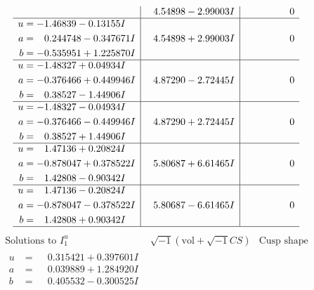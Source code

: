 \documentclass[1p]{elsarticle_modified}
\theoremstyle{definition}
\newcommand{\I}{\sqrt{-1}}
\begin{document}
$$\begin{array}{c|c|c}
 & \phantom{-}4.54898 - 2.99003 I & \phantom{-0.000000 } 0 \\ \hline\begin{aligned}
u &= -1.46839 - 0.13155 I \\
a &= \phantom{-}0.244748 - 0.347671 I \\
b &= -0.535951 + 1.225870 I\end{aligned}
 & \phantom{-}4.54898 + 2.99003 I & \phantom{-0.000000 } 0 \\ \hline\begin{aligned}
u &= -1.48327 + 0.04934 I \\
a &= -0.376466 + 0.449946 I \\
b &= \phantom{-}0.38527 - 1.44906 I\end{aligned}
 & \phantom{-}4.87290 - 2.72445 I & \phantom{-0.000000 } 0 \\ \hline\begin{aligned}
u &= -1.48327 - 0.04934 I \\
a &= -0.376466 - 0.449946 I \\
b &= \phantom{-}0.38527 + 1.44906 I\end{aligned}
 & \phantom{-}4.87290 + 2.72445 I & \phantom{-0.000000 } 0 \\ \hline\begin{aligned}
u &= \phantom{-}1.47136 + 0.20824 I \\
a &= -0.878047 + 0.378522 I \\
b &= \phantom{-}1.42808 - 0.90342 I\end{aligned}
 & \phantom{-}5.80687 + 6.61465 I & \phantom{-0.000000 } 0 \\ \hline\begin{aligned}
u &= \phantom{-}1.47136 - 0.20824 I \\
a &= -0.878047 - 0.378522 I \\
b &= \phantom{-}1.42808 + 0.90342 I\end{aligned}
 & \phantom{-}5.80687 - 6.61465 I & \phantom{-0.000000 } 0\\
 \hline 
 \end{array}$$\newpage$$\begin{array}{c|c|c}  
\text{Solutions to }I^u_{1}& \I (\text{vol} + \sqrt{-1}CS) & \text{Cusp shape}\\
 \hline 
\begin{aligned}
u &= \phantom{-}0.315421 + 0.397601 I \\
a &= \phantom{-}0.039889 + 1.284920 I \\
b &= \phantom{-}0.405532 - 0.300525 I\end{aligned}

\end{array}$$
\end{document}
